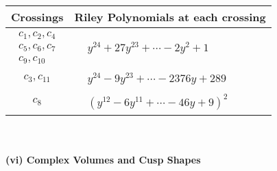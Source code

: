 \documentclass[1p]{elsarticle_modified}
\theoremstyle{definition}
\begin{document}
\begin{tabular}{m{50pt}|m{274pt}}
Crossings & \hspace{64pt}Riley Polynomials at each crossing \\
\hline $$\begin{aligned}c_{1},c_{2},c_{4}\\c_{5},c_{6},c_{7}\\c_{9},c_{10}\end{aligned}$$&$\begin{aligned}
&y^{24}+27 y^{23}+\cdots-2 y^2+1
\end{aligned}$\\
\hline $$\begin{aligned}c_{3},c_{11}\end{aligned}$$&$\begin{aligned}
&y^{24}-9 y^{23}+\cdots-2376 y+289
\end{aligned}$\\
\hline $$\begin{aligned}c_{8}\end{aligned}$$&$\begin{aligned}
&(y^{12}-6 y^{11}+\cdots-46 y+9)^{2}
\end{aligned}$\\
\hline
\end{tabular}\\~\\
\newpage\flushleft \textbf{(vi) Complex Volumes and Cusp Shapes}
\end{document}
